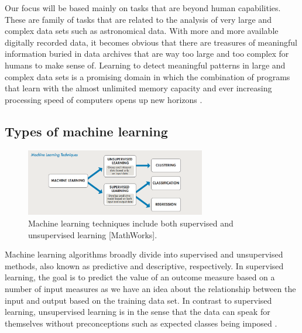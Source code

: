 Our focus will be based mainly on tasks that are beyond human capabilities. These are family of tasks that are related to the analysis of very large and complex data sets such as astronomical data. With more and more available digitally recorded data, it becomes obvious that there are treasures of meaningful information buried in data archives that are way too large and too complex for humans
to make sense of. Learning to detect meaningful patterns in large
and complex data sets is a promising domain in which the combination
of programs that learn with the almost unlimited memory
capacity and ever increasing processing speed of computers opens up new horizons \citep{shalev2014understanding}.

\subsection{Types of machine learning}

\begin{figure}[H]
  \centering
    \includegraphics[width=0.7\textwidth]{images/Ml_techs.png}
    \caption{Machine learning techniques include both supervised and unsupervised learning [MathWorks].}
  \label{sup-unsup}
\end{figure}

Machine learning algorithms broadly divide into supervised and unsupervised methods, also known as predictive and descriptive, respectively. In supervised learning, the goal is to predict the value of an outcome measure based on a number of input measures as we have an idea about the relationship between the input and output based on the training data set. In contrast to supervised learning, unsupervised learning is in the sense that the data can speak for themselves
without preconceptions such as expected classes being imposed \citep{ball2010data}. 

